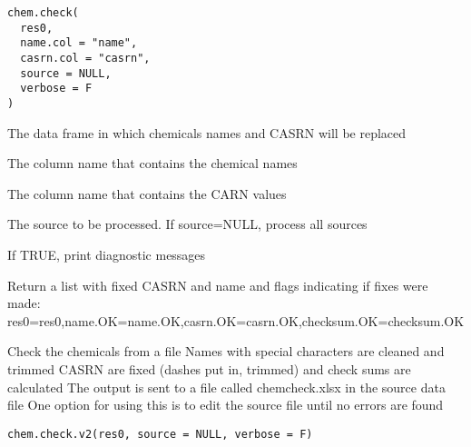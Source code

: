 \documentclass[letterpaper]{book}
\begin{document}
%
\begin{Usage}
\begin{verbatim}
chem.check(
  res0,
  name.col = "name",
  casrn.col = "casrn",
  source = NULL,
  verbose = F
)
\end{verbatim}
\end{Usage}
%
\begin{Arguments}
\begin{ldescription}
\item[\code{res0}] The data frame in which chemicals names and CASRN will be replaced

\item[\code{name.col}] The column name that contains the chemical names

\item[\code{casrn.col}] The column name that contains the CARN values

\item[\code{source}] The source to be processed. If source=NULL, process all sources

\item[\code{verbose}] If TRUE, print diagnostic messages
\end{ldescription}
\end{Arguments}
%
\begin{Value}
Return a list with fixed CASRN and name and flags indicating if fixes were made:
res0=res0,name.OK=name.OK,casrn.OK=casrn.OK,checksum.OK=checksum.OK
\end{Value}
%
\begin{Description}\relax
Check the chemicals from a file
Names with special characters are cleaned and trimmed
CASRN are fixed (dashes put in, trimmed) and check sums are calculated
The output is sent to a file called chemcheck.xlsx in the source data file
One option for using this is to edit the source file until no errors are found
\end{Description}
%
\begin{Usage}
\begin{verbatim}
chem.check.v2(res0, source = NULL, verbose = F)
\end{verbatim}
\end{Usage}
\end{document}
